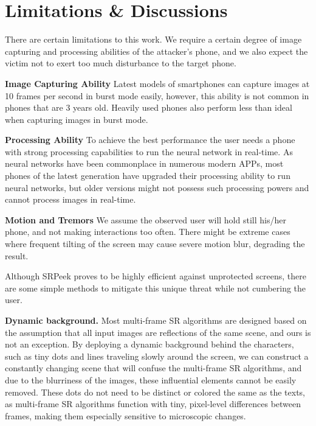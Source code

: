 \section{Limitations \& Discussions}
\label{sec-limitations-and-discussions}
There are certain limitations to this work. We require a certain degree of image capturing and processing abilities of the attacker's phone, and we also expect the victim not to exert too much disturbance to the target phone.

\vspace{1mm}
\noindent
\textbf{Image Capturing Ability}
Latest models of smartphones can capture images at 10 frames per second in burst mode easily, however, this ability is not common in phones that are 3 years old. Heavily used phones also perform less than ideal when capturing images in burst mode.

\vspace{1mm}
\noindent
\textbf{Processing Ability}
To achieve the best performance the user needs a phone with strong processing capabilities to run the neural network in real-time. As neural networks have been commonplace in numerous modern APPs, most phones of the latest generation have upgraded their processing ability to run neural networks, but older versions might not possess such processing powers and cannot process images in real-time.

\vspace{1mm}
\noindent
\textbf{Motion and Tremors}
We assume the observed user will hold still his/her phone, and not making interactions too often. There might be extreme cases where frequent tilting of the screen may cause severe motion blur, degrading the result.

Although \textsf{SRPeek} proves to be highly efficient against unprotected screens, there are some simple methods to mitigate this unique threat while not cumbering the user.

\vspace{1mm}
\noindent
\textbf{Dynamic background.} Most multi-frame SR algorithms are designed based on the assumption that all input images are reflections of the same scene, and ours is not an exception. By deploying a dynamic background behind the characters, such as tiny dots and lines traveling slowly around the screen, we can construct a constantly changing scene that will confuse the multi-frame SR algorithms, and due to the blurriness of the images, these influential elements cannot be easily removed. These dots do not need to be distinct or colored the same as the texts, as multi-frame SR algorithms function with tiny, pixel-level differences between frames, making them especially sensitive to microscopic changes.

